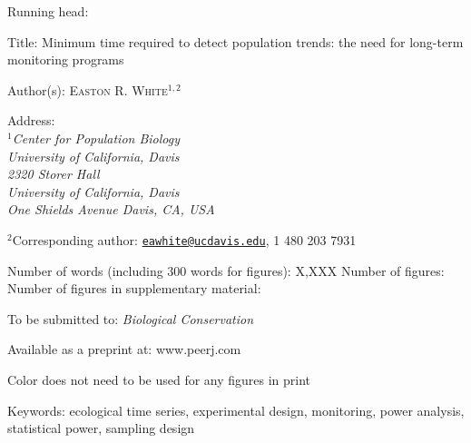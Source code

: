 \documentclass[12pt,]{article}
\title{}
\author{}
\date{}
\begin{document}
Running head: \vspace{3 mm}

Title: Minimum time required to detect population trends: the need for
long-term monitoring programs \vspace{7 mm}

Author(s): \textsc{Easton R. White$^{1,2}$} \vspace{3 mm}

Address:\emph{
    \\$^1$Center for Population Biology \\
    University of California, Davis \\
    2320 Storer Hall \\
        University of California, Davis \\
        One Shields Avenue Davis, CA, USA} \vspace{3 mm}

\(^2\)Corresponding author:
\href{mailto:eawhite@ucdavis.edu}{\nolinkurl{eawhite@ucdavis.edu}}, 1
480 203 7931 \vspace{3 mm}

Number of words (including 300 words for figures): X,XXX Number of
figures: Number of figures in supplementary material: \vspace{3 mm}

To be submitted to: \emph{Biological Conservation} \vspace{3 mm}

Available as a preprint at: www.peerj.com \vspace{3 mm}

Color does not need to be used for any figures in print \vspace{3 mm}

Keywords: ecological time series, experimental design, monitoring, power
analysis, statistical power, sampling design

\vspace{3 mm}

\pagebreak 

\linenumbers
\end{document}
